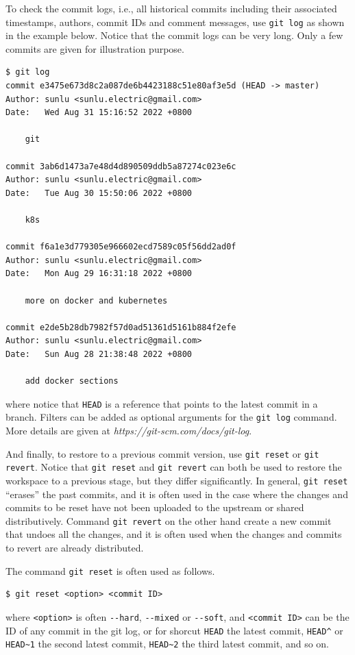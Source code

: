 To check the commit logs, i.e., all historical commits including their associated timestamps, authors, commit IDs and comment messages, use \verb|git log| as shown in the example below. Notice that the commit logs can be very long. Only a few commits are given for illustration purpose.
\begin{lstlisting}
$ git log
commit e3475e673d8c2a087de6b4423188c51e80af3e5d (HEAD -> master)
Author: sunlu <sunlu.electric@gmail.com>
Date:   Wed Aug 31 15:16:52 2022 +0800

    git

commit 3ab6d1473a7e48d4d890509ddb5a87274c023e6c
Author: sunlu <sunlu.electric@gmail.com>
Date:   Tue Aug 30 15:50:06 2022 +0800

    k8s

commit f6a1e3d779305e966602ecd7589c05f56dd2ad0f
Author: sunlu <sunlu.electric@gmail.com>
Date:   Mon Aug 29 16:31:18 2022 +0800

    more on docker and kubernetes

commit e2de5b28db7982f57d0ad51361d5161b884f2efe
Author: sunlu <sunlu.electric@gmail.com>
Date:   Sun Aug 28 21:38:48 2022 +0800

    add docker sections
\end{lstlisting}
where notice that \verb|HEAD| is a reference that points to the latest commit in a branch. Filters can be added as optional arguments for the \verb|git log| command. More details are given at \textit{https://git-scm.com/docs/git-log}.

And finally, to restore to a previous commit version, use \verb|git reset| or \verb|git revert|. Notice that \verb|git reset| and \verb|git revert| can both be used to restore the workspace to a previous stage, but they differ significantly. In general, \verb|git reset| ``erases'' the past commits, and it is often used in the case where the changes and commits to be reset have not been uploaded to the upstream or shared distributively. Command \verb|git revert| on the other hand create a new commit that undoes all the changes, and it is often used when the changes and commits to revert are already distributed.

The command \verb|git reset| is often used as follows.
\begin{lstlisting}
$ git reset <option> <commit ID>
\end{lstlisting}
where \verb|<option>| is often \verb|--hard|, \verb|--mixed| or \verb|--soft|, and \verb|<commit ID>| can be the ID of any commit in the git log, or for shorcut \verb|HEAD| the latest commit, \verb|HEAD^| or \verb|HEAD~1| the second latest commit, \verb|HEAD~2| the third latest commit, and so on.

